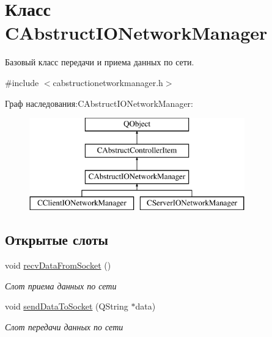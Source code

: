 \hypertarget{class_c_abstruct_i_o_network_manager}{}\section{Класс C\+Abstruct\+I\+O\+Network\+Manager}
\label{class_c_abstruct_i_o_network_manager}


Базовый класс передачи и приема данных по сети.  




{\ttfamily \#include $<$cabstructionetworkmanager.\+h$>$}

Граф наследования\+:C\+Abstruct\+I\+O\+Network\+Manager\+:\begin{figure}[H]
\begin{center}
\leavevmode
\includegraphics[height=4.000000cm]{class_c_abstruct_i_o_network_manager}
\end{center}
\end{figure}
\subsection*{Открытые слоты}
\begin{DoxyCompactItemize}
\item 
void \hyperlink{class_c_abstruct_i_o_network_manager_a78756fc08ed619162da210a9cfc09208}{recv\+Data\+From\+Socket} ()
\begin{DoxyCompactList}\small\item\em Слот приема данных по сети \end{DoxyCompactList}\item 
void \hyperlink{class_c_abstruct_i_o_network_manager_a7e6c20ce1264c76a2cc66114f8490629}{send\+Data\+To\+Socket} (Q\+String $\ast$data)
\begin{DoxyCompactList}\small\item\em Слот передачи данных по сети \end{DoxyCompactList}\end{DoxyCompactItemize}
